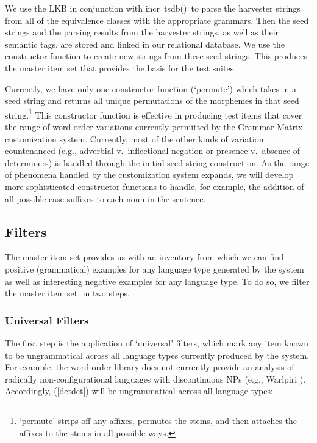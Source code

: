 \documentclass[11pt]{article}
\newcommand{\itsdb}{\mbox{\sf \lbrack incr tsdb()\rbrack}}
\begin{document}
We use the LKB in conjunction with \itsdb\ to parse the harvester strings from all of
the equivalence classes with the appropriate grammars.  Then the seed strings and the parsing results from the harvester strings, as well as their semantic tags, are stored and linked in our relational database.  We use the constructor function to create new strings from these seed strings.  This produces the master item set that provides the basis for the test suites.

Currently, we have only one constructor function (`permute') which
takes in a seed string and returns all unique permutations of the
morphemes in that seed string.\footnote{`permute' strips off any
affixes, permutes the stems, and then attaches the affixes to the
stems in all possible ways.}  This constructor function is effective
in producing test items that cover the range of word order variations
currently permitted by the Grammar Matrix customization system.  
Currently, most of the other kinds of variation countenanced (e.g.,
adverbial v.\ inflectional negation or presence v.\ absence of determiners) 
is handled through the initial seed string construction.  As the range of
phenomena handled by the customization system expands, we will develop
more sophisticated constructor functions to handle, for
example, the addition of all possible case suffixes to each noun
in the sentence.

\subsection{Filters}

The master item set provides us with an inventory from which we
can find positive (grammatical) examples for any language type
generated by the system as well as interesting negative examples for
any language type.  To do so, we filter the master item set, in two
steps.  


\subsubsection{Universal Filters}

The first step is the application of `universal' filters, which mark any
item known to be ungrammatical across all language types currently
produced by the system.  For example, the word order library does
not currently provide an analysis of radically non-configurational
languages with discontinuous NPs (e.g., Warlpiri \cite{Hale81}).
Accordingly, (\ref{detdet}) will be ungrammatical
across all language types:
\end{document}
